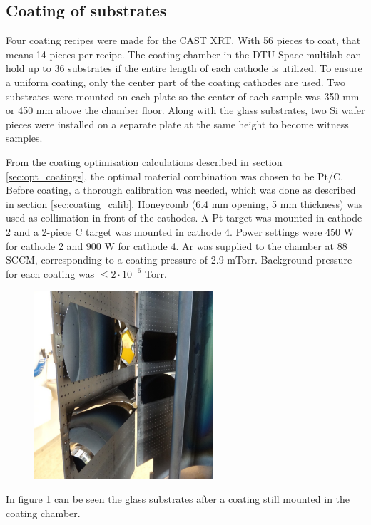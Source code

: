 \subsection{Coating of substrates}
Four coating recipes were made for the CAST XRT. With 56 pieces to coat, that means 14 pieces per recipe. The  coating chamber in the DTU Space multilab can hold up to 36 substrates if the entire length of each cathode is utilized. To ensure a uniform coating, only the center part of the coating cathodes are used. Two substrates were mounted on each plate so the center of each sample was 350 mm or 450 mm above the chamber floor. Along with the glass substrates, two Si wafer pieces were installed on a separate plate at the same height to become witness samples.

From the coating optimisation calculations described in section \ref{sec:opt_coatings}, the optimal material combination was chosen to be Pt/C. Before coating, a thorough calibration was needed, which was done as described in section \ref{sec:coating_calib}. Honeycomb (6.4 mm opening, 5 mm thickness) was used as collimation in front of the cathodes. A Pt target was mounted in cathode 2 and a 2-piece C target was mounted in cathode 4. Power settings were 450 W for cathode 2 and 900 W for cathode 4. Ar was supplied to the chamber at 88 SCCM, corresponding to a coating pressure of 2.9 mTorr. Background pressure for each coating was $\leq 2\cdot10^{-6}$ Torr.

\begin{figure}[htbp]
  \centering
    \includegraphics[height=7cm]{figures/cast/coated_pieces.jpg}
  \caption{\footnotesize }
  \label{fig:coated_pieces}
\end{figure}

In figure \ref{fig:coated_pieces} can be seen the glass substrates after a coating still mounted in the coating chamber.

